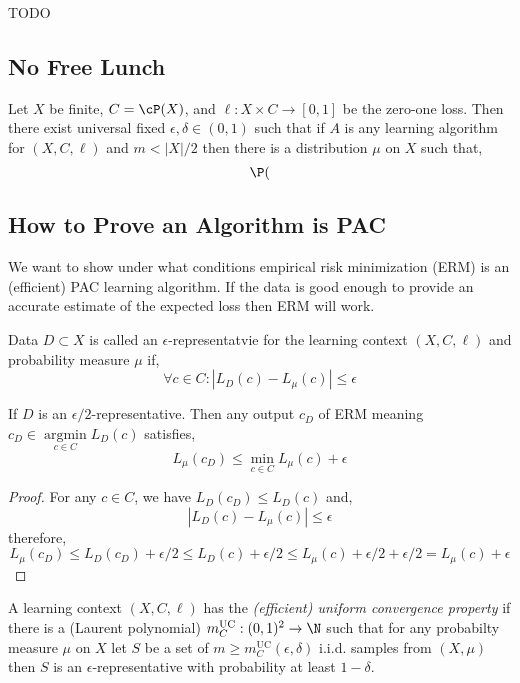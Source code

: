 \documentclass[12pt]{article}
\DeclareMathOperator{\argmin}{\mathrm{argmin}}
\begin{document}
{\color{red} TODO} 


\subsection{No Free Lunch}

\begin{theorem}
Let $X$ be finite, $C = \cP(X)$, and $\ell : X \times C \to [0,1]$ be the zero-one loss. Then there exist universal fixed $\epsilon, \delta \in (0,1)$ such that if $A$ is any learning algorithm for $(X, C, \ell)$ and $m < |X|/2$ then there is a distribution $\mu$ on $X$ such that,
\[ \P( \]
\end{theorem}

\subsection{How to Prove an Algorithm is PAC}


\begin{rmk}
We want to show under what conditions empirical risk minimization (ERM) is an (efficient) PAC learning algorithm. If the data is good enough to provide an accurate estimate of the expected loss then ERM will work.
\end{rmk}

\begin{defn}
Data $D \subset X$ is called an $\epsilon$-representatvie for the learning context $(X, C, \ell)$ and probability measure $\mu$ if,
\[ \forall c \in C : |L_D(c) - L_\mu(c)| \le \epsilon \]
\end{defn}

\begin{lemma}
If $D$ is an $\epsilon/2$-representative. Then any output $c_D$ of ERM meaning $c_D \in \argmin\limits_{c \in C} L_D(c)$ satisfies,
\[ L_\mu(c_D) \le \min_{c \in C} L_\mu(c) + \epsilon \]
\end{lemma}

\begin{proof}
For any $c \in C$, we have $L_D(c_D) \le L_D(c)$  and,
\[ |L_D(c) - L_\mu(c)| \le \epsilon \]
therefore,
\[ L_\mu(c_D) \le L_D(c_D) + \epsilon/2 \le L_D(c) + \epsilon/2 \le L_\mu(c) + \epsilon/2 + \epsilon/2 = L_\mu(c) + \epsilon \]
\end{proof}

\begin{defn}
A learning context $(X, C, \ell)$ has the \textit{(efficient) uniform convergence property} if there is a (Laurent polynomial) $m^{\text{UC}}_C : (0,1)^2 \to \N$ such that for any probabilty measure $\mu$ on $X$ let $S$ be a set of $m \ge m_C^{\text{UC}}(\epsilon, \delta)$ i.i.d. samples from $(X, \mu)$ then $S$ is an $\epsilon$-representative with probability at least $1 - \delta$.
\end{defn}
\end{document}
